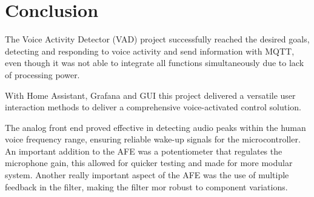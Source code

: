 \section{Conclusion}

The Voice Activity Detector (VAD) project successfully reached the desired goals, detecting and responding to voice activity and send information with MQTT, even though it was not able to integrate all functions simultaneously due to lack of processing power. 

With Home Assistant, Grafana and GUI this project delivered a versatile user interaction methods to deliver a comprehensive voice-activated control solution.

The analog front end proved effective in detecting audio peaks within the human voice frequency range, ensuring reliable wake-up signals for the microcontroller. An important addition to the AFE was a potentiometer that regulates the microphone gain, this allowed for quicker testing and made for more modular system. Another really important aspect of the AFE was the use of multiple feedback in the filter, making the filter mor robust to component variations.